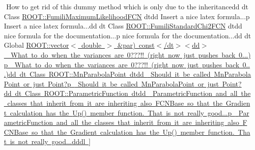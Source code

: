 \begin{DoxyRefList}
{{$$%
How to get rid of this dummy method which is only due to the inheritancedd dt Class \mbox{\hyperlink{classROOT_1_1Minuit2_1_1FumiliMaximumLikelihoodFCN}{R\+O\+OT\+:\+:Fumili\+Maximum\+Likelihood\+F\+CN}} dtdd \label{todo__todo000008}%
%
Insert a nice latex formula...p \label{todo__todo000020}%
%
Insert a nice latex formula...dd dt Class \mbox{\hyperlink{classROOT_1_1Minuit2_1_1FumiliStandardChi2FCN}{R\+O\+OT\+:\+:Fumili\+Standard\+Chi2\+F\+CN}} dtdd \label{todo__todo000009}%
%
nice formula for the documentation...p \label{todo__todo000021}%
%
nice formula for the documentation...dd dt Global \mbox{\hyperlink{classROOT_1_1Minuit2_1_1FumiliStandardChi2FCN_ae7683cdbfa4160902add963d2132ab76}{R\+O\+OT\+:\+:vector$<$ double $>$ \&par) const$<$/dt$>$$<$dd$>$ \label{todo__todo000010}%
%
What to do when the variances are 0???!! (right now just pushes back 0...)p \label{todo__todo000022}%
%
What to do when the variances are 0???!! (right now just pushes back 0...)dd dt Class \mbox{\hyperlink{classROOT_1_1Minuit2_1_1MnParabolaPoint}{R\+O\+OT\+:\+:Mn\+Parabola\+Point}} dtdd \label{todo__todo000011}%
%
Should it be called \mbox{\hyperlink{classROOT_1_1Minuit2_1_1MnParabolaPoint}{Mn\+Parabola\+Point}} or just Point?p \label{todo__todo000023}%
%
Should it be called \mbox{\hyperlink{classROOT_1_1Minuit2_1_1MnParabolaPoint}{Mn\+Parabola\+Point}} or just Point?dd dt Class \mbox{\hyperlink{classROOT_1_1Minuit2_1_1ParametricFunction}{R\+O\+OT\+:\+:Parametric\+Function}} dtdd \label{todo__todo000012}%
%
\mbox{\hyperlink{classROOT_1_1Minuit2_1_1ParametricFunction}{Parametric\+Function}} and all the classes that inherit from it are inheriting also \mbox{\hyperlink{classROOT_1_1Minuit2_1_1FCNBase}{F\+C\+N\+Base}} so that the Gradient calculation has the \mbox{\hyperlink{classROOT_1_1Minuit2_1_1FCNBase_a04ef08ddad92ce8d89d498efbe021c39}{Up()}} member function. That is not really good...p \label{todo__todo000024}%
%
\mbox{\hyperlink{classROOT_1_1Minuit2_1_1ParametricFunction}{Parametric\+Function}} and all the classes that inherit from it are inheriting also \mbox{\hyperlink{classROOT_1_1Minuit2_1_1FCNBase}{F\+C\+N\+Base}} so that the Gradient calculation has the \mbox{\hyperlink{classROOT_1_1Minuit2_1_1FCNBase_a04ef08ddad92ce8d89d498efbe021c39}{Up()}} member function. That is not really good...dddl }}}}]
\end{DoxyRefList}